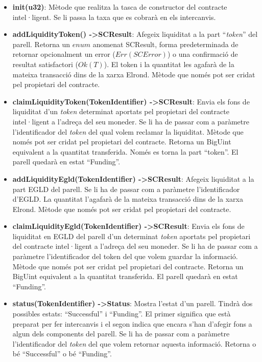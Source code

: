 \documentclass[11pt,a4paper]{article}
\begin{document}
\begin{itemize}
\item \textbf{init(u32)}: Mètode que realitza la tasca de constructor del contracte intel·ligent. Se li passa la taxa que es cobrarà en els intercanvis.
\item \textbf{addLiquidityToken() -\textgreater SCResult}: Afegeix liquiditat a la part ``\textit{token}'' del parell. Retorna un \(enum\) anomenat SCResult, forma predeterminada de retornar opcionalment un error (\(Err(SCError)\)) o una confirmació de resultat satisfactori (\(Ok(T)\)). El token i la quantitat les agafarà de la mateixa transacció dins de la xarxa Elrond. Mètode que només pot ser cridat pel propietari del contracte.
\item \textbf{claimLiquidityToken(TokenIdentifier)  -\textgreater SCResult}: Envia els fons de liquiditat d'un \textit{token} determinat aportats pel propietari del contracte intel·ligent a l'adreça del seu moneder. Se li ha de passar com a paràmetre l'identificador del \textit{token} del qual volem reclamar la liquiditat. Mètode que només pot ser cridat pel propietari del contracte. Retorna un BigUint equivalent a la quantitat transferida. Només es torna la part ``token''. El parell quedarà en estat ``Funding''.
\item \textbf{addLiquidityEgld(TokenIdentifier)  -\textgreater SCResult}: Afegeix liquiditat a la part EGLD del parell. Se li ha de passar com a paràmetre l'identificador d'EGLD. La quantitat l'agafarà de la mateixa transacció dins de la xarxa Elrond. Mètode que només pot ser cridat pel propietari del contracte.
\item \textbf{claimLiquidityEgld(TokenIdentifier)  -\textgreater SCResult}: Envia els fons de liquiditat en EGLD del parell d'un determinat \textit{token} aportats pel propietari del contracte intel·ligent a l'adreça del seu moneder. Se li ha de passar com a paràmetre l'identificador del token del que volem guardar la informació. Mètode que només pot ser cridat pel propietari del contracte. Retorna un BigUint equivalent a la quantitat transferida. El parell quedarà en estat ``Funding''.
\item \textbf{status(TokenIdentifier) -\textgreater Status}: Mostra l'estat d'un parell. Tindrà dos possibles estats: ``Successful'' i ``Funding''. El primer significa que està preparat per fer intercanvis i el segon indica que encara s'han d'afegir fons a algun dels components del parell. Se li ha de passar com a paràmetre l'identificador del \textit{token} del que volem retornar aquesta informació. Retorna o bé ``Successful'' o bé ``Funding''.

\end{itemize}
\end{document}
